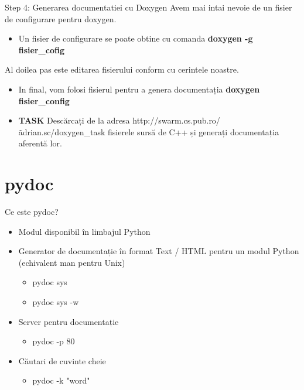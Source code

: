 \documentclass{beamer}
\begin{document}
\begin{frame}{Step 4: Generarea documentatiei cu Doxygen}
	Avem mai intai nevoie de un fisier de configurare pentru doxygen.
	\pause
	\begin{itemize}
		\item Un fisier de configurare se poate obtine cu comanda {\bf doxygen -g fisier\_cofig}
	\end{itemize}
	\pause
	Al doilea pas este editarea fisierului conform cu cerintele noastre.
	\pause
	\begin{itemize}
		\item In final, vom folosi fisierul pentru a genera documentația {\bf doxygen fisier\_config}
	\end{itemize}
	\pause
	\begin{itemize}
		\item {\bf TASK} Descărcați de la adresa http://swarm.cs.pub.ro/\~adrian.sc/doxygen\_task fisierele sursă de C++ și generați documentația aferentă lor.
	\end{itemize}
\end{frame}

\section{pydoc}

\begin{frame}{Ce este pydoc?}
  \begin{itemize}
  \item Modul disponibil în limbajul Python
  \pause
  \item Generator de documentație în format Text / HTML pentru un modul Python
  (echivalent man pentru Unix)
  \pause
    \begin{itemize}
      \item pydoc sys
      \pause
      \item pydoc sys -w
    \end{itemize}
  \pause
  \item Server pentru documentație
    \begin{itemize}
      \item pydoc -p 80
    \end{itemize}
  \pause
  \item Căutari de cuvinte cheie
    \begin{itemize}
      \item pydoc -k "word"
    \end{itemize}
  \end{itemize}
\end{frame}
\end{document}
